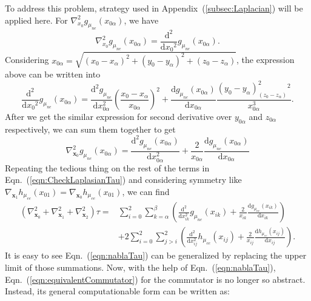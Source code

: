 To address this problem, strategy used in Appendix~(\ref{subsec:Laplacian}) will be applied here. For $\nabla_{x_0}^2g_{\mu_{ne}}(x_{0\alpha})$, we have
\begin{equation}
    \nabla_{x_0}^2g_{\mu_{ne}}(x_{0\alpha})=\frac{\text{d}^2}{\text{d}{x_0}^2}g_{\mu_{ne}}(x_{0\alpha}).
\end{equation}
Considering $x_{0\alpha}=\sqrt{(x_0-x_{\alpha})^2+(y_0-y_{\alpha})^2+(z_0-z_{\alpha})}$, the expression above can be written into 
\begin{equation}
    \frac{\text{d}^2}{\text{d}{x_0}^2}g_{\mu_{ne}}(x_{0\alpha})=\frac{\text{d}^2g_{\mu_{ne}}}{\text{d}x_{0\alpha}^2}\left(\frac{x_0-x_{\alpha}}{x_{0\alpha}}\right)^2+\frac{\text{d}g_{\mu_{ne}}(x_{0\alpha})}{\text{d}x_{0\alpha}}\frac{(y_0-y_{\alpha})^2_(z_0-z_{\alpha})^2}{x_{0\alpha}^3}.
\end{equation}
After we get the similar expression for second derivative over $y_{0\alpha}$ and $z_{0\alpha}$ respectively, we can sum them together to get
\begin{equation}
    \nabla_{\textbf{x}_0}^2g_{\mu_{ne}}(x_{0\alpha})=\frac{\text{d}^2g_{\mu_{ne}}(x_{0\alpha})}{\text{d}x_{0\alpha}^2}+\frac{2}{x_{0\alpha}}\frac{\text{d}g_{\mu_{ne}}(x_{0\alpha})}{\text{d}x_{0\alpha}}
    \label{eqn:Secondgmune}
\end{equation}
Repeating the tedious thing on the rest of the terms in Eqn.~(\ref{eqn:CheckLaplasianTau}) and considering symmetry like $\nabla_{\mathbf{x}_1}h_{\mu_{ee}}(x_{01})=\nabla_{\mathbf{x}_0}h_{\mu_{ee}}(x_{01})$, we can find
\begin{equation}
    \begin{split}
        (\nabla_{\textbf{x}_0}^2+\nabla_{\textbf{x}_1}^2+\nabla_{\textbf{x}_2}^2)\tau=&\sum_{i=0}^{2}\sum_{k=\alpha}^{\beta}\left(\frac{\text{d}^2}{\text{d}x_{ik}^2}g_{\mu_{ne}}(x_{ik})+\frac{2}{x_{ik}}\frac{\text{d}g_{\mu_{ne}}(x_{ik})}{\text{d}x_{ik}}\right)\\
        &+2\sum_{i=0}^{2}\sum_{j>i}^{2}\left(\frac{\text{d}^2}{\text{d}x_{ij}^2}h_{\mu_{ee}}(x_{ij})+\frac{2}{x_{ij}}\frac{\text{d}h_{\mu_{ee}}(x_{ij})}{\text{d}x_{ij}}\right).
    \end{split}    
    \label{eqn:nablaTau}
\end{equation}
It is easy to see Eqn.~(\ref{eqn:nablaTau}) can be generalized by replacing the upper limit of those summations. Now, with the help of Eqn.~(\ref{eqn:nablaTau}), Eqn.~(\ref{eqn:equivalentCommutator}) for the commutator is no longer so abstract. Instead, its general computationable form can be written as:
